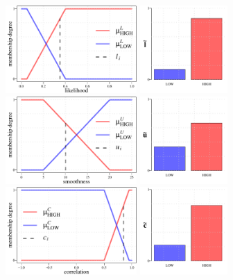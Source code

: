 \begin{figure}%
	\centering
	\includegraphics[height=9em]{L_fuzzification_1}
	\includegraphics[height=9em]{L_fuzzification_2} \\[2ex]
	\includegraphics[height=9em]{U_fuzzification_1}
	\includegraphics[height=9em]{U_fuzzification_2} \\[2ex]
	\includegraphics[height=9em]{C_fuzzification_1}
	\includegraphics[height=9em]{C_fuzzification_2} \\

\end{figure}
